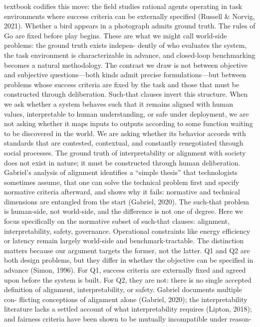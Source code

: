 textbook codifies this move: the field studies rational agents
operating in task environments where success criteria can
be externally specified (Russell \& Norvig, 2021). Whether a
bird appears in a photograph admits ground truth. The rules
of Go are fixed before play begins. These are what we might
call world-side problems: the ground truth exists indepen-
dently of who evaluates the system, the task environment is
characterizable in advance, and closed-loop benchmarking
becomes a natural methodology. The contrast we draw is
not between objective and subjective questions—both kinds
admit precise formulations—but between problems whose
success criteria are fixed by the task and those that must be
constructed through deliberation.
Such-that clauses invert this structure. When we ask whether
a system behaves such that it remains aligned with human
values, interpretable to human understanding, or safe under
deployment, we are not asking whether it maps inputs to
outputs according to some function waiting to be discovered
in the world. We are asking whether its behavior accords
with standards that are contested, contextual, and constantly
renegotiated through social processes. The ground truth of
interpretability or alignment with society does not exist in
nature; it must be constructed through human deliberation.
Gabriel’s analysis of alignment identifies a “simple thesis”
that technologists sometimes assume, that one can solve
the technical problem first and specify normative criteria
afterward, and shows why it fails: normative and technical
dimensions are entangled from the start (Gabriel, 2020). The
such-that problem is human-side, not world-side, and the
difference is not one of degree. Here we focus specifically
on the normative subset of such-that clauses: alignment,
interpretability, safety, governance. Operational constraints
like energy efficiency or latency remain largely world-side
and benchmark-tractable. The distinction matters because
our argument targets the former, not the latter.
Q1 and Q2 are both design problems, but they differ in
whether the objective can be specified in advance (Simon,
1996). For Q1, success criteria are externally fixed and
agreed upon before the system is built. For Q2, they are
not: there is no single accepted definition of alignment,
interpretability, or safety. Gabriel documents multiple con-
flicting conceptions of alignment alone (Gabriel, 2020); the
interpretability literature lacks a settled account of what
interpretability requires (Lipton, 2018); and fairness criteria
have been shown to be mutually incompatible under reason-
